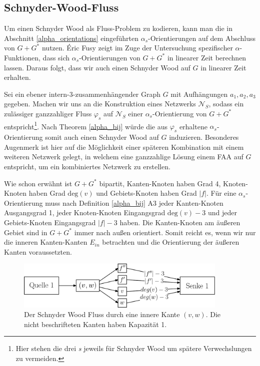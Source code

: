 \subsection{Schnyder-Wood-Fluss}

Um einen Schnyder Wood als Fluss-Problem zu kodieren, kann man die in Abschnitt \ref{alpha_orientations} eingeführten $\alpha_s$-Orientierungen auf dem Abschluss von $G+G^*$ nutzen. \'Eric Fusy zeigt im Zuge der Untersuchung spezifischer $\alpha$-Funktionen, dass sich $\alpha_s$-Orientierungen von $G+G^*$ in linearer Zeit berechnen lassen\cite{fusy07}. Daraus folgt, dass wir auch einen Schnyder Wood auf $G$ in linearer Zeit erhalten. 

Sei ein ebener intern-3-zusammenhängender Graph $G$ mit Aufhängungen $a_1,a_2,a_3$ gegeben. Machen wir uns an die Konstruktion eines Netzwerks $\mathcal{N}_S$, sodass ein zulässiger ganzzahliger Fluss $\varphi_s$ auf $\mathcal{N}_S$ einer $\alpha_s$-Orientierung von $G+G^*$ entspricht\footnote{Hier stehen die drei \textit{s} jeweils für Schnyder Wood um spätere Verwechslungen zu vermeiden.}. Nach Theorem \ref{alpha_bij} würde die aus $\varphi_s$ erhaltene $\alpha_s$-Orientierung somit auch einen Schnyder Wood auf $G$ induzieren. Besonderes Augenmerk ist hier auf die Möglichkeit einer späteren Kombination mit einem weiteren Netzwerk gelegt, in welchem eine ganzzahlige Lösung einem FAA auf $G$ entspricht, um ein kombiniertes Netzwerk zu erstellen.

Wie schon erwähnt ist $G+G^*$ bipartit, Kanten-Knoten haben Grad 4, Knoten-Knoten haben Grad $\text{deg}(v)$ und Gebiets-Knoten haben Grad $|f|$. Für eine $\alpha_s$-Orien\-tier\-ung muss nach Definition \ref{alpha_bij} A3 jeder Kanten-Knoten Ausgangsgrad 1, jeder Knoten-Knoten Eingangsgrad $\text{deg}(v)-3$ und jeder Gebiets-Knoten Eingangsgrad $|f|-3$ haben. Die Kanten-Knoten am äußeren Gebiet sind in $G+G^*$ immer nach außen orientiert. Somit reicht es, wenn wir nur die inneren Kanten-Kanten $E_{in}$ betrachten und die Orientierung der äußeren Kanten voraussetzten.

\begin{figure}[h]
	\centering
  \includegraphics[width=0.9\textwidth]{schnyder_flow.png}
  \caption{Der Schnyder Wood Fluss durch eine innere Kante $(v,w)$. Die nicht beschrifteten Kanten haben Kapazität 1.}
  \label{schnyder_flow}
\end{figure}

